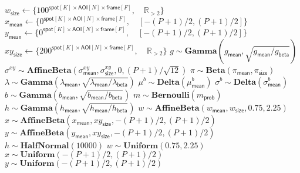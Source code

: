 \begin{algorithm}
\begin{algorithmic}[1]
{    $w_\mathsf{size} \gets \{ 100^{\mathsf{spot}[K] \times \mathsf{AOI}[N] \times \mathsf{frame}[F]}, \quad \mathbb{R}_{>2} \} $ \\
    $x_\mathsf{mean} \gets \{ 0^{\mathsf{spot}[K] \times \mathsf{AOI}[N] \times \mathsf{frame}[F]}, \quad [-(P+1)/2, (P+1)/2] \} $ \\
    $y_\mathsf{mean} \gets \{ 0^{\mathsf{spot}[K] \times \mathsf{AOI}[N] \times \mathsf{frame}[F]}, \quad [-(P+1)/2, (P+1)/2] \} $ \\
    $xy_\mathsf{size} \gets \{ 200^{\mathsf{spot}[K] \times \mathsf{AOI}[N] \times \mathsf{frame}[F]}, \quad \mathbb{R}_{>2} \} $ }
\State $g \sim \mathbf{Gamma}(g_\mathsf{mean}, \sqrt{g_\mathsf{mean} / g_\mathsf{beta}})$
\State $\sigma^{xy} \sim \mathbf{AffineBeta}(\sigma^{xy}_\mathsf{mean}, \sigma^{xy}_\mathsf{size}, 0, (P+1) / \sqrt{12})$
\State $\pi \sim \mathbf{Beta}(\pi_\mathsf{mean}, \pi_\mathsf{size})$
\State $\lambda \sim \mathbf{Gamma}(\lambda_\mathsf{mean}, \sqrt{\lambda_\mathsf{mean} / \lambda_\mathsf{beta}})$
    \State $\mu^b \sim \mathbf{Delta}(\mu^b_\mathsf{mean})$
    \State $\sigma^b \sim \mathbf{Delta}(\sigma^b_\mathsf{mean})$
        \State $b \sim \mathbf{Gamma}(b_\mathsf{mean}, \sqrt{b_\mathsf{mean} / b_\mathsf{beta}})$
            \State $m \sim \mathbf{Bernoulli}(m_\mathsf{prob})$
                \State $h \sim \mathbf{Gamma}(h_\mathsf{mean}, \sqrt{h_\mathsf{mean} / h_\mathsf{beta}})$
                \State $w \sim \mathbf{AffineBeta}(w_\mathsf{mean}, w_\mathsf{size}, 0.75, 2.25)$
                \State $x \sim \mathbf{AffineBeta} \left( x_\mathsf{mean}, xy_\mathsf{size}, -(P+1)/2, (P+1)/2 \right) $
                \State $y \sim \mathbf{AffineBeta} \left( y_\mathsf{mean}, xy_\mathsf{size}, -(P+1)/2, (P+1)/2 \right)$
                \State $h \sim \mathbf{HalfNormal}(10000)$
                \State $w \sim \mathbf{Uniform}(0.75, 2.25)$
                \State $x \sim \mathbf{Uniform}(-(P+1)/2, (P+1)/2)$
                \State $y \sim \mathbf{Uniform}(-(P+1)/2, (P+1)/2)$
            \EndIf
        \EndFor
    \EndFor
\EndFor
\end{algorithmic}
\end{algorithm}